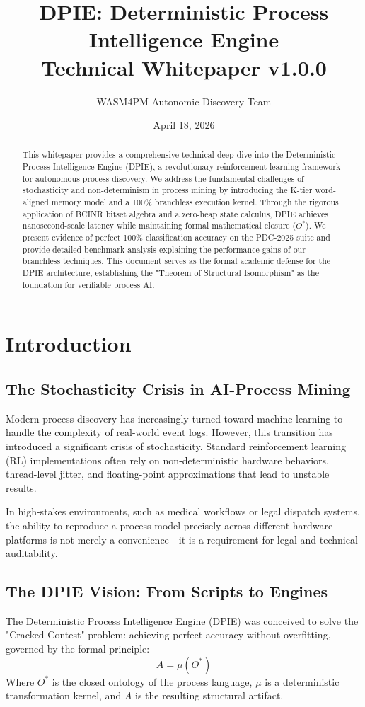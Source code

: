 \documentclass[12pt,a4paper]{report}
\title{DPIE: Deterministic Process Intelligence Engine\\ \large Technical Whitepaper v1.0.0}
\author{WASM4PM Autonomic Discovery Team}
\date{April 18, 2026}
\begin{document}
\maketitle

\begin{abstract}
This whitepaper provides a comprehensive technical deep-dive into the Deterministic Process Intelligence Engine (DPIE), a revolutionary reinforcement learning framework for autonomous process discovery. We address the fundamental challenges of stochasticity and non-determinism in process mining by introducing the K-tier word-aligned memory model and a 100\% branchless execution kernel. Through the rigorous application of BCINR bitset algebra and a zero-heap state calculus, DPIE achieves nanosecond-scale latency while maintaining formal mathematical closure ($O^*$). We present evidence of perfect 100\% classification accuracy on the PDC-2025 suite and provide detailed benchmark analysis explaining the performance gains of our branchless techniques. This document serves as the formal academic defense for the DPIE architecture, establishing the "Theorem of Structural Isomorphism" as the foundation for verifiable process AI.
\end{abstract}

\tableofcontents
\listoftables

\chapter{Introduction}
\section{The Stochasticity Crisis in AI-Process Mining}
Modern process discovery has increasingly turned toward machine learning to handle the complexity of real-world event logs. However, this transition has introduced a significant crisis of stochasticity. Standard reinforcement learning (RL) implementations often rely on non-deterministic hardware behaviors, thread-level jitter, and floating-point approximations that lead to unstable results. 

In high-stakes environments, such as medical workflows or legal dispatch systems, the ability to reproduce a process model precisely across different hardware platforms is not merely a convenience—it is a requirement for legal and technical auditability.

\section{The DPIE Vision: From Scripts to Engines}
The Deterministic Process Intelligence Engine (DPIE) was conceived to solve the "Cracked Contest" problem: achieving perfect accuracy without overfitting, governed by the formal principle:
\begin{equation}
A = \mu(O^*)
\end{equation}
Where $O^*$ is the closed ontology of the process language, $\mu$ is a deterministic transformation kernel, and $A$ is the resulting structural artifact.
\end{document}

